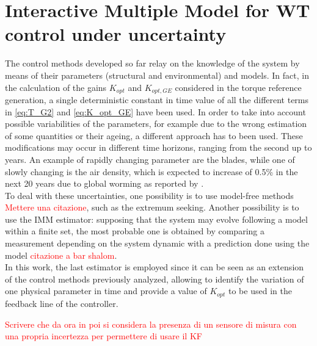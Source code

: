 \section{Interactive Multiple Model for WT control under uncertainty}\label{sec:c_other_controls}
The control methods developed so far relay on the knowledge of the system by means of their parameters (structural and environmental) and models. In fact, in the calculation of the gains $K_{opt}$ and $K_{opt,GE}$ considered in the torque reference generation, a single deterministic constant in time value of all the different terms in \autoref{eq:T_G2} and \autoref{eq:K_opt_GE} have been used. In order to take into account possible variabilities of the parameters, for example due to the wrong estimation of some quantities or their ageing, a different approach has to been used. These modifications may occur in different time horizons, ranging from the second up to years. An example of rapidly changing parameter are the blades, while one of slowly changing is the air density, which is expected to increase of 0.5\% in the next 20 years due to global worming as reported by \cite{en12112038}. \\
To deal with these uncertainties, one possibility is to use model-free methods \textcolor{red}{Mettere una citazione}, such as the extremum seeking. Another possibility is to use the \acrfull{IMM} estimator: supposing that the system may evolve following a model within a finite set, the most probable one is obtained by comparing a measurement depending on the system dynamic with a prediction done using the model \textcolor{red}{citazione a bar shalom}. \\
In this work, the last estimator is employed since it can be seen as an extension of the control methods previously analyzed, allowing to identify the variation of one physical parameter in time and provide a value of $K_{opt}$ to be used in the feedback line of the controller.

\textcolor{red}{Scrivere che da ora in poi si considera la presenza di un sensore di misura con una propria incertezza per permettere di usare il KF}

